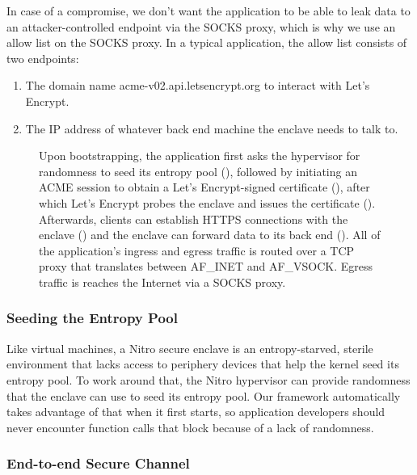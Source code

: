 In case of a compromise, we don't want the application to be able to leak data
to an attacker-controlled endpoint via the SOCKS proxy, which is why we use an
allow list on the SOCKS proxy.  In a typical application, the allow list
consists of two endpoints:

\begin{enumerate}
    \item The domain name acme-v02.api.letsencrypt.org to interact with Let's
      Encrypt.
    \item The IP address of whatever back end machine the enclave needs to talk
      to.
\end{enumerate}


\newcommand{\addr}[1]{{\footnotesize \color{gray}#1 }}

\begin{figure}[t]
\centering

\caption{Upon bootstrapping, the application first asks the hypervisor for
  randomness to seed its entropy pool (), followed by initiating an
  ACME session to obtain a Let's Encrypt-signed certificate (), after
  which Let's Encrypt probes the enclave and issues the certificate
  ().  Afterwards, clients can establish HTTPS connections with the
  enclave () and the enclave can forward data to its back end
  ().  All of the application's ingress and egress  traffic is routed
  over a TCP proxy that translates between AF\_INET and AF\_VSOCK.  Egress
  traffic is reaches the Internet via a SOCKS proxy.}
\label{fig:networking}
\end{figure}

\subsubsection{Seeding the Entropy Pool}
\label{sec:entropy}

Like virtual machines, a Nitro secure enclave is an entropy-starved, sterile
environment that lacks access to periphery devices that help the kernel seed its
entropy pool.  To work around that, the Nitro hypervisor can provide randomness
that the enclave can use to seed its entropy pool.  Our framework automatically
takes advantage of that when it first starts, so application developers should
never encounter function calls that block because of a lack of randomness.

\subsubsection{End-to-end Secure Channel}
\label{sec:cert}

